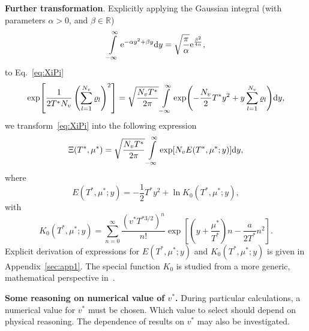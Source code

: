 \documentclass[12pt]{article}
\numberwithin{equation}{section}
\begin{document}
	\textbf{Further transformation}. Explicitly applying the Gaussian integral (with parameters $\alpha > 0$, and $\beta \in \mathbb{R}$)
	\begin{equation}
		\int\limits_{-\infty}^{\infty} {\rm e}^{-\alpha y^2 + \beta y} {\rm d}y = \sqrt{\frac{\pi}{\alpha}} {\rm e}^{\frac{\beta^2}{4\alpha}},
	\end{equation}
	to Eq.~\eqref{eq:XiPi}
	\begin{equation}
		\label{eq:gaussInt}
		\exp[\frac{1}{2 T^* N_v}\left(\sum_{l=1}^{N_v} \varrho_l\right)^2] = \sqrt{\frac{N_v T^*}{2\pi}}
		\int\limits_{-\infty}^{\infty} \exp(-\frac{N_v}{2} T^* y^2 + y\sum_{l=1}^{N_v} \varrho_l) {\rm d}y,
	\end{equation}
	we transform~\eqref{eq:XiPi} into the following expression
	\begin{equation}
		\label{eq:XiInty}
		\Xi (T^*, \mu^*) = \sqrt{\frac{N_v T^*}{2\pi}} \int\limits_{-\infty}^{\infty} \exp[N_v E(T^*, \mu^*; y)] {\rm d} y,
	\end{equation}
	where 
	\begin{equation}
		\label{def:E}
		E(T^*,\mu^*; y) = -\frac12T^*y^2 + \ln K_0(T^*,\mu^*; y),
	\end{equation}
	with
	\begin{equation}
		\label{def:K}
		K_0(T^*,\mu^*; y) = \sum_{n=0}^{\infty} \frac{\left(v^* T^{*3/2}\right)^n}{n!} \exp[\left(y+\frac{\mu^*}{T^*}\right)n - \frac{a}{2T^*}n^2].
	\end{equation}
	Explicit derivation of expressions for $E(T^*,\mu^*;y)$ and $K_0(T^*,\mu^*;y)$ is given in Appendix~\ref{sec:app1}. The special function $K_0$ is studied from a more generic, mathematical perspective in~\cite{DS25arxiv}.
	
	\textbf{Some reasoning on numerical value of $v^*$.} During particular calculations, a numerical value for $v^*$ must be chosen. Which value to select should depend on physical reasoning. The dependence of results on $v^*$ may also be investigated.
	
\end{document}
